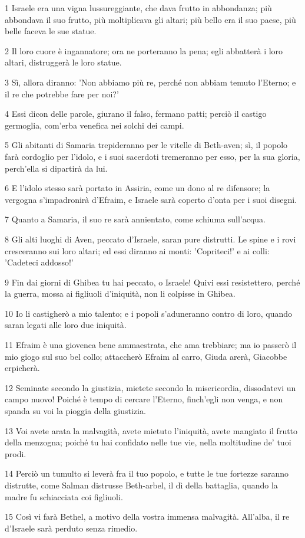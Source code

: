 \par 1 Israele era una vigna lussureggiante, che dava frutto in abbondanza; più abbondava il suo frutto, più moltiplicava gli altari; più bello era il suo paese, più belle faceva le sue statue.
\par 2 Il loro cuore è ingannatore; ora ne porteranno la pena; egli abbatterà i loro altari, distruggerà le loro statue.
\par 3 Sì, allora diranno: 'Non abbiamo più re, perché non abbiam temuto l'Eterno; e il re che potrebbe fare per noi?'
\par 4 Essi dicon delle parole, giurano il falso, fermano patti; perciò il castigo germoglia, com'erba venefica nei solchi dei campi.
\par 5 Gli abitanti di Samaria trepideranno per le vitelle di Beth-aven; sì, il popolo farà cordoglio per l'idolo, e i suoi sacerdoti tremeranno per esso, per la sua gloria, perch'ella si dipartirà da lui.
\par 6 E l'idolo stesso sarà portato in Assiria, come un dono al re difensore; la vergogna s'impadronirà d'Efraim, e Israele sarà coperto d'onta per i suoi disegni.
\par 7 Quanto a Samaria, il suo re sarà annientato, come schiuma sull'acqua.
\par 8 Gli alti luoghi di Aven, peccato d'Israele, saran pure distrutti. Le spine e i rovi cresceranno sui loro altari; ed essi diranno ai monti: 'Copriteci!' e ai colli: 'Cadeteci addosso!'
\par 9 Fin dai giorni di Ghibea tu hai peccato, o Israele! Quivi essi resistettero, perché la guerra, mossa ai figliuoli d'iniquità, non li colpisse in Ghibea.
\par 10 Io li castigherò a mio talento; e i popoli s'aduneranno contro di loro, quando saran legati alle loro due iniquità.
\par 11 Efraim è una giovenca bene ammaestrata, che ama trebbiare; ma io passerò il mio giogo sul suo bel collo; attaccherò Efraim al carro, Giuda arerà, Giacobbe erpicherà.
\par 12 Seminate secondo la giustizia, mietete secondo la misericordia, dissodatevi un campo nuovo! Poiché è tempo di cercare l'Eterno, finch'egli non venga, e non spanda su voi la pioggia della giustizia.
\par 13 Voi avete arata la malvagità, avete mietuto l'iniquità, avete mangiato il frutto della menzogna; poiché tu hai confidato nelle tue vie, nella moltitudine de' tuoi prodi.
\par 14 Perciò un tumulto si leverà fra il tuo popolo, e tutte le tue fortezze saranno distrutte, come Salman distrusse Beth-arbel, il dì della battaglia, quando la madre fu schiacciata coi figliuoli.
\par 15 Così vi farà Bethel, a motivo della vostra immensa malvagità. All'alba, il re d'Israele sarà perduto senza rimedio.

